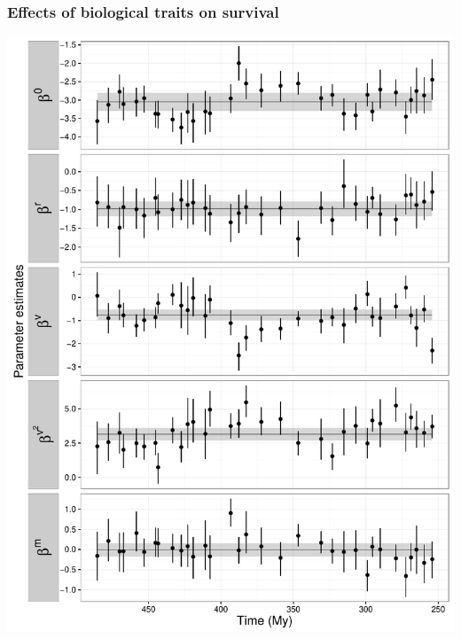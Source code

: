 \documentclass{beamer}
\begin{document}
\begin{frame}
  \frametitle{Effects of biological traits on survival}
  \begin{center}
    \includegraphics[width=\textwidth,height=0.8\textheight,keepaspectratio=true]{figure/cohort_series}
  \end{center}
\end{frame}
\end{document}
